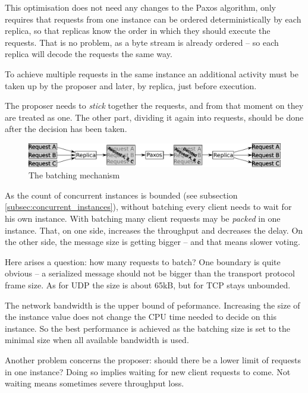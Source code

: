 This optimisation does not need any changes to the Paxos algorithm, only requires that requests from one instance can be ordered deterministically by each replica, so that replicas know the order in which they should execute the requests. That is no problem, as a byte stream is already ordered -- so each replica will decode the requests the same way.

To achieve multiple requests in the same instance an additional activity must be taken up by the proposer and later, by replica, just before execution.

The proposer needs to \textit{stick} together the requests, and from that moment on they are treated as one. The other part, dividing it again into requests, should be done after the decision has been taken.
\begin{figure}[h]
\includegraphics[keepaspectratio, width=\textwidth]{features/batching.pdf}
\vspace{-1em}
\caption{The batching mechanism}
\vspace{-1em}
\end{figure}

As the count of concurrent instances is bounded (see subsection \ref{subsec:concurrent_instances}), without batching every client needs to wait for his own instance. With batching many client requests may be \textit{packed} in one instance. That, on one side, increases the throughput and decreases the delay.
On the other side, the message size is getting bigger -- and that means slower voting.

Here arises a question: how many requests to batch? One boundary is quite obvious -- a serialized message should not be bigger than the transport protocol frame size. As for UDP the size is about 65kB, but for TCP stays unbounded.

The network bandwidth is the upper bound of peformance. Increasing the size of the instance value does not change the CPU time needed to decide on this instance. So the best performance is achieved as the batching size is set to the minimal size when all available bandwidth is used.

Another problem concerns the proposer: should there be a lower limit of requests in one instance? Doing so implies waiting for new client requests to come. Not waiting means sometimes severe throughput loss.

